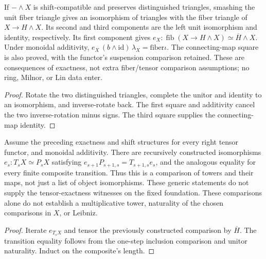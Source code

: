 \begin{proposition}
  \label{prop:h6-fiber-smash-step}
  \leanok
  If $-\wedge X$ is shift-compatible and preserves distinguished triangles,
  smashing the unit fiber triangle gives an isomorphism of triangles with
  the fiber triangle of $X\to H\wedge X$. Its second and third components
  are the left unit isomorphism and identity, respectively. Its first
  component gives
  $e_X:\operatorname{fib}(X\to H\wedge X)\simeq\overline H\wedge X$.
  Under monoidal additivity,
  $e_X\,(b\wedge\mathrm{id})\,\lambda_X=\mathrm{fiber}\iota$.
  The connecting-map square is also proved, with the functor's suspension
  comparison retained. These are consequences of exactness, not extra
  fiber/tensor comparison assumptions; no ring, Milnor, or Lin data enter.
\end{proposition}
\begin{proof}
  Rotate the two distinguished triangles, complete the unitor and identity
  to an isomorphism, and inverse-rotate back. The first square and
  additivity cancel the two inverse-rotation minus signs. The third square
  supplies the connecting-map identity.
  \leanok
\end{proof}

\begin{proposition}
  \label{prop:h6-tower-smash-comparison}
  \leanok
  Assume the preceding exactness and shift structures for every right tensor
  functor, and monoidal additivity. There are recursively constructed
  isomorphisms $e_s:T_sX\simeq P_sX$ satisfying
  $e_{s+1}P_{s+1,s}=T_{s+1,s}e_s$, and the analogous equality for every
  finite composite transition. Thus this is a comparison of towers and
  their maps, not just a list of object isomorphisms. These generic
  statements do not supply the tensor-exactness witnesses on the fixed
  foundation. These comparisons alone do not establish a multiplicative
  tower, naturality of the chosen comparisons in $X$, or Leibniz.
\end{proposition}
\begin{proof}
  Iterate $e_{T_sX}$ and tensor the previously constructed comparison by
  $\overline H$. The transition equality follows from the one-step inclusion
  comparison and unitor naturality. Induct on the composite's length.
  \leanok
\end{proof}

